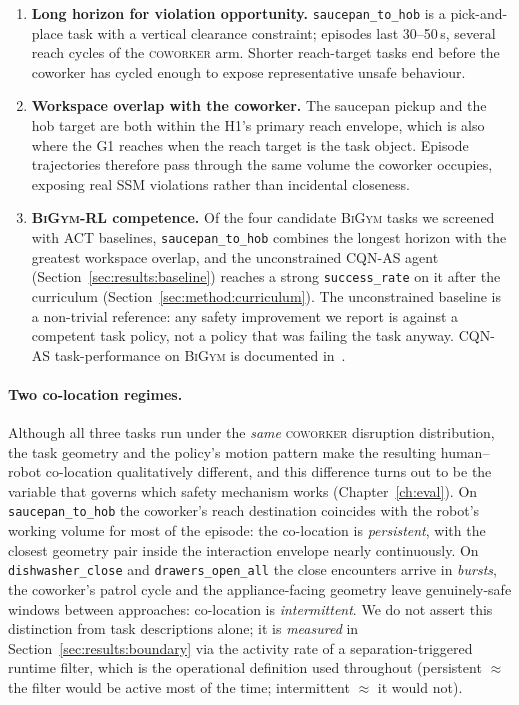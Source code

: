 \documentclass[11pt,a4paper]{report}
\newcommand{\ssm}{SSM}
\newcommand{\bigym}{\textsc{BiGym}}
\newcommand{\cqnas}{CQN-AS}
\newcommand{\coworker}{\textsc{coworker}}
\begin{document}
\begin{enumerate}[topsep=2pt,itemsep=2pt]
\item \textbf{Long horizon for violation opportunity.}
  \texttt{saucepan\_to\_hob} is a pick-and-place task with a
  vertical clearance constraint; episodes last 30--50\,s, several
  reach cycles of the \coworker{} arm. Shorter reach-target tasks
  end before the coworker has cycled enough to expose representative
  unsafe behaviour.
\item \textbf{Workspace overlap with the coworker.} The saucepan
  pickup and the hob target are both within the H1's primary
  reach envelope, which is also where the G1 reaches when the
  reach target is the task object. Episode trajectories therefore
  pass through the same volume the coworker occupies, exposing
  real \ssm{} violations rather than incidental closeness.
\item \textbf{\bigym{}-RL competence.} Of the four candidate
  \bigym{} tasks we screened with ACT baselines, \texttt{saucepan\_to\_hob}
  combines the longest horizon with the greatest workspace overlap,
  and the unconstrained \cqnas{} agent
  (Section~\ref{sec:results:baseline}) reaches a strong
  \texttt{success\_rate} on it after the curriculum
  (Section~\ref{sec:method:curriculum}). The unconstrained baseline
  is a non-trivial reference: any safety improvement we report is
  against a competent task policy, not a policy that was failing the
  task anyway. \cqnas{} task-performance on \bigym{} is documented
  in~\cite{seo2024cqnas}.
\end{enumerate}

\paragraph{Two co-location regimes.}
Although all three tasks run under the \emph{same} \coworker{}
disruption distribution, the task geometry and the policy's motion
pattern make the resulting human--robot co-location qualitatively
different, and this difference turns out to be the variable that
governs which safety mechanism works (Chapter~\ref{ch:eval}). On
\texttt{saucepan\_to\_hob} the coworker's reach destination coincides
with the robot's working volume for most of the episode: the
co-location is \emph{persistent}, with the closest geometry pair
inside the interaction envelope nearly continuously. On
\texttt{dishwasher\_close} and \texttt{drawers\_open\_all} the close
encounters arrive in \emph{bursts}, the coworker's patrol cycle and
the appliance-facing geometry leave genuinely-safe windows between
approaches: co-location is \emph{intermittent}. We do not assert this
distinction from task descriptions alone; it is \emph{measured} in
Section~\ref{sec:results:boundary} via the activity rate of a
separation-triggered runtime filter, which is the operational
definition used throughout (persistent $\approx$ the filter would be
active most of the time; intermittent $\approx$ it would not).
\end{document}
